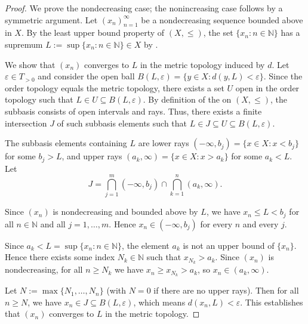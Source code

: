 \begin{proof}
    We prove the nondecreasing case; the nonincreasing case follows by a symmetric argument. Let $(x_n)_{n=1}^\infty$ be a nondecreasing sequence bounded above in $X$. By the least upper bound property of $(X, \leq)$, the set $\{x_n : n \in \mathbb{N}\}$ has a supremum $L := \sup\{x_n : n \in \mathbb{N}\} \in X$ by .

    We show that $(x_n)$ converges to $L$ in the metric topology induced by $d$. Let $\varepsilon \in T_{>0}$ and consider the open ball $B(L, \varepsilon) = \{y \in X : d(y, L) < \varepsilon\}$. Since the order topology equals the metric topology, there exists a set $U$ open in the order topology such that $L \in U \subseteq B(L, \varepsilon)$. By definition of the  on $(X, \leq)$, the subbasis consists of open intervals and rays. Thus, there exists a finite intersection $J$ of such subbasis elements such that $L \in J \subseteq U \subseteq B(L, \varepsilon)$.

    The subbasis elements containing $L$ are lower rays $(-\infty, b_j) = \{x \in X : x < b_j\}$ for some $b_j > L$, and upper rays $(a_k, \infty) = \{x \in X : x > a_k\}$ for some $a_k < L$. Let
    $$J = \bigcap_{j=1}^m (-\infty, b_j) \cap \bigcap_{k=1}^n (a_k, \infty).$$

    Since $(x_n)$ is nondecreasing and bounded above by $L$, we have $x_n \leq L < b_j$ for all $n \in \mathbb{N}$ and all $j = 1, \dots, m$. Hence $x_n \in (-\infty, b_j)$ for every $n$ and every $j$.

    Since $a_k < L = \sup\{x_n : n \in \mathbb{N}\}$, the element $a_k$ is not an upper bound of $\{x_n\}$. Hence there exists some index $N_k \in \mathbb{N}$ such that $x_{N_k} > a_k$. Since $(x_n)$ is nondecreasing, for all $n \geq N_k$ we have $x_n \geq x_{N_k} > a_k$, so $x_n \in (a_k, \infty)$.

    Let $N := \max\{N_1, \dots, N_n\}$ (with $N = 0$ if there are no upper rays). Then for all $n \geq N$, we have $x_n \in J \subseteq B(L, \varepsilon)$, which means $d(x_n, L) < \varepsilon$. This establishes that $(x_n)$ converges to $L$ in the metric topology.
\end{proof}
